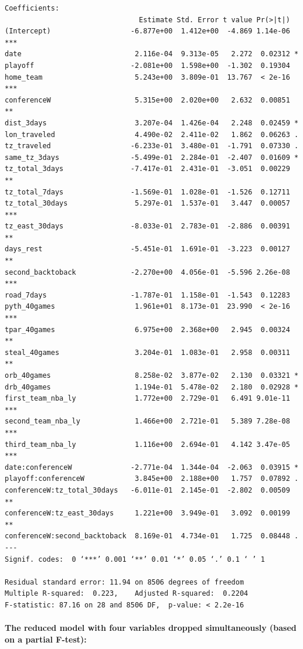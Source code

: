 \documentclass[
    12pt,
    a4paper,
    titlepage,  %
    abstract,  %
    headings=standardclasses,  %
    bibliography=totocnumbered  %
]{scrartcl}
\begin{document}
\begin{Verbatim}
Coefficients:
                                Estimate Std. Error t value Pr(>|t|)    
(Intercept)                   -6.877e+00  1.412e+00  -4.869 1.14e-06 ***
date                           2.116e-04  9.313e-05   2.272  0.02312 *  
playoff                       -2.081e+00  1.598e+00  -1.302  0.19304    
home_team                      5.243e+00  3.809e-01  13.767  < 2e-16 ***
conferenceW                    5.315e+00  2.020e+00   2.632  0.00851 ** 
dist_3days                     3.207e-04  1.426e-04   2.248  0.02459 *  
lon_traveled                   4.490e-02  2.411e-02   1.862  0.06263 .  
tz_traveled                   -6.233e-01  3.480e-01  -1.791  0.07330 .  
same_tz_3days                 -5.499e-01  2.284e-01  -2.407  0.01609 *  
tz_total_3days                -7.417e-01  2.431e-01  -3.051  0.00229 ** 
tz_total_7days                -1.569e-01  1.028e-01  -1.526  0.12711    
tz_total_30days                5.297e-01  1.537e-01   3.447  0.00057 ***
tz_east_30days                -8.033e-01  2.783e-01  -2.886  0.00391 ** 
days_rest                     -5.451e-01  1.691e-01  -3.223  0.00127 ** 
second_backtoback             -2.270e+00  4.056e-01  -5.596 2.26e-08 ***
road_7days                    -1.787e-01  1.158e-01  -1.543  0.12283    
pyth_40games                   1.961e+01  8.173e-01  23.990  < 2e-16 ***
tpar_40games                   6.975e+00  2.368e+00   2.945  0.00324 ** 
steal_40games                  3.204e-01  1.083e-01   2.958  0.00311 ** 
orb_40games                    8.258e-02  3.877e-02   2.130  0.03321 *  
drb_40games                    1.194e-01  5.478e-02   2.180  0.02928 *  
first_team_nba_ly              1.772e+00  2.729e-01   6.491 9.01e-11 ***
second_team_nba_ly             1.466e+00  2.721e-01   5.389 7.28e-08 ***
third_team_nba_ly              1.116e+00  2.694e-01   4.142 3.47e-05 ***
date:conferenceW              -2.771e-04  1.344e-04  -2.063  0.03915 *  
playoff:conferenceW            3.845e+00  2.188e+00   1.757  0.07892 .  
conferenceW:tz_total_30days   -6.011e-01  2.145e-01  -2.802  0.00509 ** 
conferenceW:tz_east_30days     1.221e+00  3.949e-01   3.092  0.00199 ** 
conferenceW:second_backtoback  8.169e-01  4.734e-01   1.725  0.08448 .  
---
Signif. codes:  0 ‘***’ 0.001 ‘**’ 0.01 ‘*’ 0.05 ‘.’ 0.1 ‘ ’ 1

Residual standard error: 11.94 on 8506 degrees of freedom
Multiple R-squared:  0.223,    Adjusted R-squared:  0.2204 
F-statistic: 87.16 on 28 and 8506 DF,  p-value: < 2.2e-16
\end{Verbatim}

\paragraph{The reduced model with four variables dropped simultaneously (based on a partial F-test):}
\end{document}
